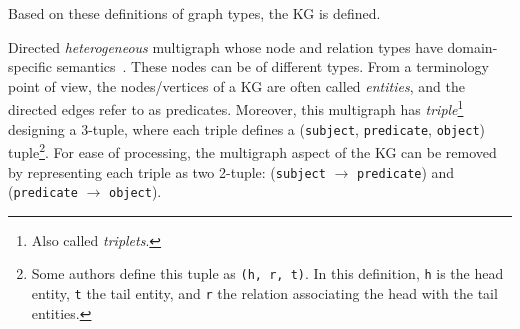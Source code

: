 \noindent Based on these definitions of graph types, the KG is defined.
\begin{definition}
Directed \emph{heterogeneous} multigraph whose node and relation types have
domain-specific semantics~\citep{website:kamakoti}. These nodes can be of
different types. From a terminology point of view, the nodes/vertices of a KG
are often called \emph{entities}, and the directed edges refer to as
predicates. Moreover, this multigraph has \emph{triple}\footnote{Also called
\emph{triplets}.} designing a 3-tuple, where each triple defines a
(\texttt{subject}, \texttt{predicate}, \texttt{object}) tuple\footnote{Some
authors define this tuple as \texttt{(h, r, t)}. In this definition, \texttt{h}
is the head entity, \texttt{t} the tail entity, and \texttt{r} the relation
associating the head with the tail entities.}. For ease of processing, the
multigraph aspect of the KG can be removed by representing each triple as two
2-tuple: (\texttt{subject} $\rightarrow$ \texttt{predicate}) and
(\texttt{predicate} $\rightarrow$ \texttt{object}).
\end{definition}

